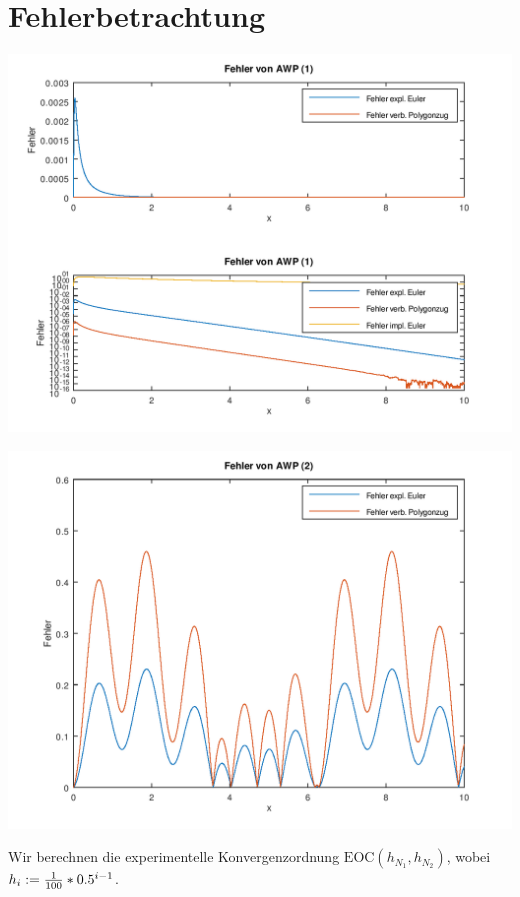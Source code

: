\documentclass[ %
ngerman, %
a4paper, %
12pt, %
sectionreset, %
chapterstyle=framed, %
sectionstyle=dotted, %
titlefont=osfamily %
]{../../../../texmf/tex/latex/mathscriptMathTUD/mathscriptMathTUD}
\begin{document}
	\section{Fehlerbetrachtung}
	
	\begin{center}
		\includegraphics[width=.75\textwidth]{./fehler1.png}
		\label{fig: fehler1}
	\end{center}

	\begin{center}
		\includegraphics[width=.75\textwidth]{./fehler2.png}
		\label{fig: fehler2}
	\end{center}
	
	
	Wir berechnen die experimentelle Konvergenzordnung $\mathrm{EOC}(h_{N_1}, h_{N_2})$, wobei $h_i \mathrel{:=} \frac{1}{100} * 0.5^{i-1}$.
	
	\smallskip
	
\end{document}
